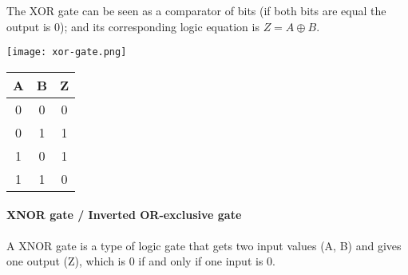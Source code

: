 The XOR gate can be seen as a comparator of bits (if both bits are equal the output is 0); and its corresponding logic equation is $Z = A\oplus B$.

\begin{minipage}{\textwidth}
\vspace{1cm}
\begin{minipage}[c]{0.49\textwidth}
    \centering
    \texttt{[image: xor-gate.png]}
\end{minipage}
\hfill
\begin{minipage}[c]{.49\textwidth}
    \centering
    \begin{tabular}{ |c|c|c| } \hline 
        \textbf{A} & \textbf{B} & \textbf{Z} \\ \hline
        0 & 0 & 0 \\
        0 & 1 & 1 \\
        1 & 0 & 1 \\
        1 & 1 & 0 \\       
        \hline
    \end{tabular}
\end{minipage}
\end{minipage}


\paragraph{XNOR gate / Inverted OR-exclusive gate}
\begin{definition}
    A XNOR gate is a type of logic gate that gets two input values (A, B) and gives one output (Z), which is 0 if and only if one input is 0.
\end{definition}

